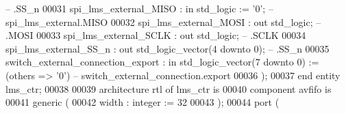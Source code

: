 \begin{DoxyCode}
{       --                                 .SS\_n}
00031         \textcolor{vhdlchar}{spi_lms_external_MISO}                   \textcolor{vhdlchar}{:} \textcolor{keywordflow}{in}    \textcolor{comment}{std\_logic}                     \textcolor{vhdlchar}{:=} \textcolor{vhdlchar}{'}\textcolor{vhdllogic}{}\textcolor{vhdllogic}{0}\textcolor{vhdlchar}{'};\textcolor{keyword}{            
       --                 spi\_lms\_external.MISO}
00032         \textcolor{vhdlchar}{spi_lms_external_MOSI}                   \textcolor{vhdlchar}{:} \textcolor{keywordflow}{out}   \textcolor{comment}{std\_logic};\textcolor{keyword}{                                       
       --                                 .MOSI}
00033         \textcolor{vhdlchar}{spi_lms_external_SCLK}                   \textcolor{vhdlchar}{:} \textcolor{keywordflow}{out}   \textcolor{comment}{std\_logic};\textcolor{keyword}{                                       
       --                                 .SCLK}
00034         \textcolor{vhdlchar}{spi_lms_external_SS_n}                   \textcolor{vhdlchar}{:} \textcolor{keywordflow}{out}   \textcolor{comment}{std\_logic\_vector}\textcolor{vhdlchar}{(}\textcolor{vhdllogic}{}\textcolor{vhdllogic}{4} \textcolor{keywordflow}{downto} \textcolor{vhdllogic}{}\textcolor{vhdllogic}{0}\textcolor{vhdlchar}{)};\textcolor{keyword}{                    
       --                                 .SS\_n}
00035         \textcolor{vhdlchar}{switch_external_connection_export}       \textcolor{vhdlchar}{:} \textcolor{keywordflow}{in}    \textcolor{comment}{std\_logic\_vector}\textcolor{vhdlchar}{(}\textcolor{vhdllogic}{}\textcolor{vhdllogic}{7} \textcolor{keywordflow}{downto} \textcolor{vhdllogic}{}\textcolor{vhdllogic}{0}\textcolor{vhdlchar}{)}  \textcolor{vhdlchar}{:=} \textcolor{vhdlchar}{(}\textcolor{keywordflow}{others} \textcolor{vhdlchar}{=}\textcolor{vhdlchar}{>} \textcolor{vhdlchar}{'}\textcolor{vhdllogic}{}\textcolor{vhdllogic}{0}\textcolor{vhdlchar}{'}\textcolor{vhdlchar}{)}\textcolor{keyword}{ 
       --       switch\_external\_connection.export}
00036     \textcolor{vhdlchar}{)};
00037 \textcolor{keywordflow}{end} \textcolor{keywordflow}{entity} \textcolor{vhdlchar}{lms\_ctr};
00038 
00039 \textcolor{keywordflow}{architecture} rtl \textcolor{keywordflow}{of} lms_ctr is
00040     \textcolor{keywordflow}{component} avfifo \textcolor{keywordflow}{is}
00041         \textcolor{keywordflow}{generic} (
00042             width : \textcolor{comment}{integer} := \textcolor{vhdllogic}{}\textcolor{vhdllogic}{32}
00043         );
00044         \textcolor{keywordflow}{port} (

\end{DoxyCode}
